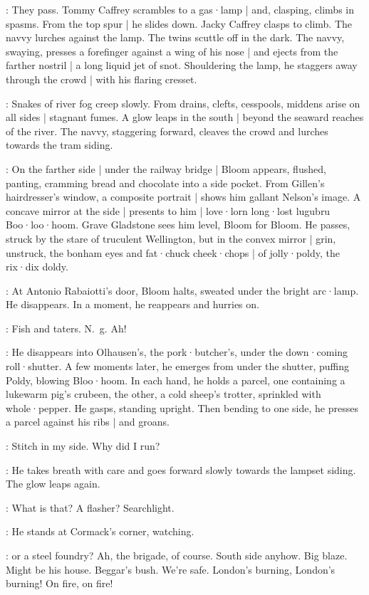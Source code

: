:
They pass.
Tommy Caffrey scrambles to a gas·lamp |
and,
clasping,
climbs in spasms.
From the top spur |
he slides down.
Jacky Caffrey clasps to climb.
The navvy lurches against the lamp.
The twins scuttle off in the dark.
The navvy,
swaying,
presses a forefinger against a wing of his nose |
and ejects from the farther nostril |
a long liquid jet of snot.
Shouldering the lamp,
he staggers away through the crowd |
with his flaring cresset.

:
Snakes of river fog creep slowly.
From drains,
clefts,
cesspools,
middens
arise on all sides |
stagnant fumes.
A glow leaps in the south |
beyond the seaward reaches of the river.
The navvy,
staggering forward,
cleaves the crowd
and lurches towards the tram siding.

:
On the farther side |
under the railway bridge |
Bloom appears,
flushed,
panting,
cramming bread and chocolate into a side pocket.
From Gillen's hairdresser's window,
a composite portrait |
shows him gallant Nelson's image.
A concave mirror at the side |
presents to him |
love·lorn long·lost lugubru Boo·loo·hoom.
Grave Gladstone sees him level,
Bloom for Bloom.
He passes,
struck by the stare of truculent Wellington,
but in the convex mirror |
grin,
unstruck,
the bonham eyes and fat·chuck cheek·chops |
of jolly·poldy,
the rix·dix doldy.

:
At Antonio Rabaiotti's door,
Bloom halts,
sweated under the bright arc·lamp.
He disappears.
In a moment,
he reappears and hurries on.

\Bloom:
Fish and taters.
N.~g.
Ah!

:
He disappears into Olhausen's,
the pork·butcher's,
under the down·coming roll·shutter.
A few moments later,
he emerges from under the shutter,
puffing Poldy,
blowing Bloo·hoom.
In each hand,
he holds a parcel,
one containing a lukewarm pig's crubeen,
the other,
a cold sheep's trotter,
sprinkled with whole·pepper.
He gasps,
standing upright.
Then bending to one side,
he presses a parcel against his ribs |
and groans.

\Bloom:
Stitch in my side.
Why did I run?

:
He takes breath with care and goes forward slowly towards the lampset siding.
The glow leaps again.

\Bloom:
What is that?
A flasher?
Searchlight.

:
He stands at Cormack's corner,
watching.

\Bloom:
or a steel foundry?
Ah,
the brigade,
of course.
South side anyhow.
Big blaze.
Might be his house.
Beggar's bush.
We're safe.
London's burning,
London's burning!
On fire,
on fire!

